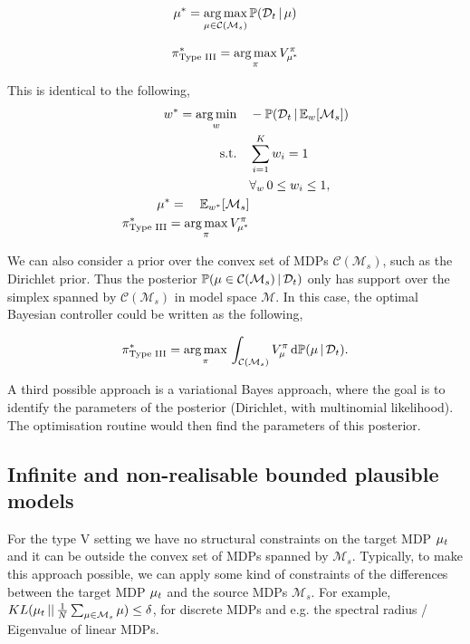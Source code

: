 \begin{equation}
    \mu^{*} = \underset{\mu \in \mathcal{C}(\mathcal{M}_s)}{\arg \max} \, \mathbb{P}(\mathcal{D}_t \, | \, \mu)
\end{equation}

\begin{equation}
    \pi_{\textrm{Type III}}^{*} = \underset{\pi}{\arg \max} \, V_{\mu^{*}}^\pi
\end{equation}

This is identical to the following,
\begin{equation}
\begin{aligned}
w^{*} = \underset{w}{\arg\min} \quad & -\mathbb{P}(\mathcal{D}_t \, | \, \mathbb{E}_w [\mathcal{M}_s])\\
\textrm{s.t.} \quad & \sum_{i=1}^K w_i = 1\\
  &\forall_w \, 0 \leq w_i \leq 1,    \\
\mu^{*} = \quad \mathbb{E}_{w^{*}}[\mathcal{M}_s]\\
\pi^{*}_{\textrm{Type III}} = \underset{\pi}{\arg\max} \, V_{\mu^{*}}^\pi
\end{aligned}
\end{equation}

We can also consider a prior over the convex set of MDPs $\mathcal{C}(\mathcal{M}_s)$, such as the Dirichlet prior. Thus the posterior $\mathbb{P}(\mu \in \mathcal{C}(\mathcal{M}_s) \, | \, \mathcal{D}_t)$ only has support over the simplex spanned by $\mathcal{C}(\mathcal{M}_s)$ in model space $\mathcal{M}$. In this case, the optimal Bayesian controller could be written as the following,

\begin{equation}
  \pi_{\textrm{Type III}}^{*} = \underset{\pi}{\arg \max} \, \int_{\mathcal{C}(\mathcal{M}_s)} V_\mu^\pi \, \mathrm{d} \mathbb{P}(\mu \, | \, \mathcal{D}_t).
\end{equation}

A third possible approach is a variational Bayes approach, where the goal is to identify the parameters of the posterior (Dirichlet, with multinomial likelihood). The optimisation routine would then find the parameters of this posterior.

\subsection{Infinite and non-realisable bounded plausible models}

For the type V setting we have no structural constraints on the target MDP $\mu_t$ and it can be outside the convex set of MDPs spanned by $\mathcal{M}_s$. Typically, to make this approach possible, we can apply some kind of constraints of the differences between the target MDP $\mu_t$ and the source MDPs $\mathcal{M}_s$. For example, $KL(\mu_t \, || \, \frac{1}{N}\sum_{\mu \in \mathcal{M}_s} \mu) \leq \delta$, for discrete MDPs and e.g. the spectral radius / Eigenvalue of linear MDPs.

